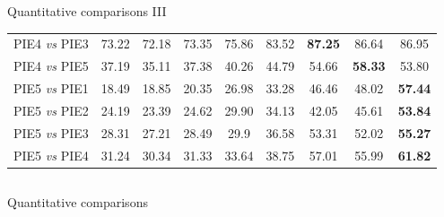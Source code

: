 \documentclass{beamer}
\begin{document}
\begin{frame}
\begin{columns}[totalwidth=\textwidth]
\begin{column}{\textwidth}
{\begin{block}{Quantitative comparisons III}
\begin{table}[h!]
{\begin{tabular}{|l |c |c |c| c |c |c | c| c|}
			\\
			PIE4 \emph{vs} PIE3&   73.22&	72.18&	73.35&	75.86&	83.52&	\textbf{87.25}&	86.64&	86.95
			\\
			PIE4 \emph{vs} PIE5&   37.19&	35.11&	37.38&	40.26&	44.79&	54.66&	\textbf{ 58.33}&	53.80
			\\
			PIE5 \emph{vs} PIE1&  18.49&	18.85&	20.35&	26.98&	33.28&	46.46&	48.02&	\textbf{ 57.44}
			\\
			PIE5 \emph{vs} PIE2&   24.19&	23.39&	24.62&	29.90&	34.13&	42.05&	45.61&	\textbf{ 53.84}
			\\
			PIE5 \emph{vs} PIE3&  28.31&	27.21&	28.49&	29.9&	36.58&	53.31&	52.02&	\textbf{ 55.27}
			\\
			PIE5 \emph{vs} PIE4&   31.24&	30.34&	31.33&	33.64&	38.75&	57.01&	55.99&	\textbf{ 61.82}
		
			\\
			\hline
    \end{tabular}}
	\end{table}
    \end{block}
    }
    \end{column}
    \end{columns}
\end{frame}

\begin{frame}
{Quantitative comparisons}
\begin{columns}[totalwidth=\textwidth]
\begin{column}{\textwidth}
    
    \end{column}
    \end{columns}
\end{frame}
\end{document}
